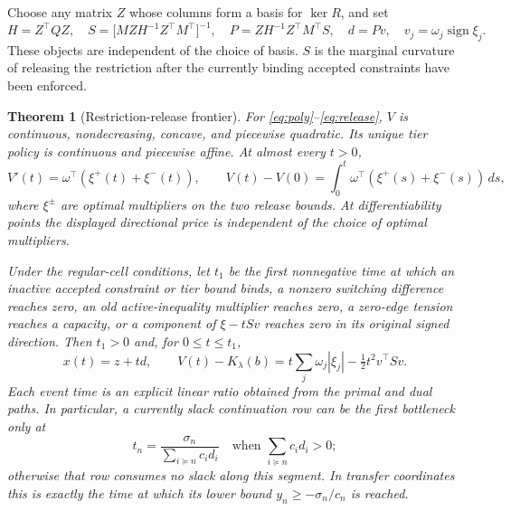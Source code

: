 \documentclass[11pt,letterpaper]{article}
\newtheorem{theorem}{Theorem}[section]
\theoremstyle{definition}\newtheorem{assumption}[theorem]{Assumption}
\begin{document}
Choose any matrix $Z$ whose columns form a basis for $\ker R$, and set
\begin{equation}\label{eq:release-matrices}
 H=Z^\top QZ,\quad
 S=\bigl[MZH^{-1}Z^\top M^\top\bigr]^{-1},\quad
 P=ZH^{-1}Z^\top M^\top S,\quad
 d=P v,\quad v_j=\omega_j\operatorname{sign}\xi_j.
\end{equation}
These objects are independent of the choice of basis. $S$ is the marginal curvature of releasing the restriction after the currently binding accepted constraints have been enforced.

\begin{theorem}[Restriction-release frontier]\label{thm:release}
For \eqref{eq:poly}--\eqref{eq:release}, $V$ is continuous, nondecreasing, concave, and piecewise quadratic. Its unique tier policy is continuous and piecewise affine. At almost every $t>0$,
\begin{equation}\label{eq:restriction-rent}
 V'(t)=\omega^\top(\xi^+(t)+\xi^-(t)),
 \qquad V(t)-V(0)=\int_0^t\omega^\top(\xi^+(s)+\xi^-(s))\,ds,
\end{equation}
where $\xi^\pm$ are optimal multipliers on the two release bounds. At differentiability points the displayed directional price is independent of the choice of optimal multipliers.

Under the regular-cell conditions, let $t_1$ be the first nonnegative time at which an inactive accepted constraint or tier bound binds, a nonzero switching difference reaches zero, an old active-inequality multiplier reaches zero, a zero-edge tension reaches a capacity, or a component of $\xi-tSv$ reaches zero in its original signed direction. Then $t_1>0$ and, for $0\leq t\leq t_1$,
\begin{equation}\label{eq:release-exact}
 x(t)=z+td,\qquad
 V(t)-K_\lambda(b)=t\sum_j\omega_j|\xi_j|-\tfrac12t^2 v^\top Sv.
\end{equation}
Each event time is an explicit linear ratio obtained from the primal and dual paths. In particular, a currently slack continuation row can be the first bottleneck only at
\begin{equation}\label{eq:slack-break}
 t_n=\frac{\sigma_n}{\sum_{i\succeq n}c_i d_i}
 \quad\text{when }\sum_{i\succeq n}c_i d_i>0;
\end{equation}
otherwise that row consumes no slack along this segment. In transfer coordinates this is exactly the time at which its lower bound $y_n\geq-\sigma_n/c_n$ is reached.
\end{theorem}
\end{document}
